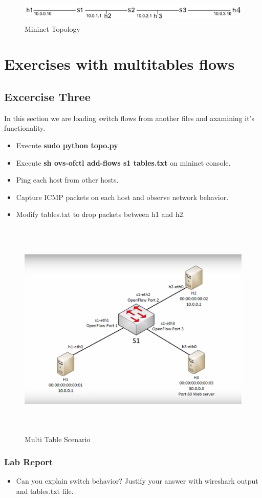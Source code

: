 \documentclass{../UTNetLab}
\begin{document}
    \begin{figure}[H]
    	\centering
    	\includegraphics[height=30pt]{img/fig1.png}
    	\caption{Mininet Topology}
    	\label{fig:linearRouters}
    \end{figure}


\section{Exercises with multitables flows}
    \subsection*{Excercise Three}
    In this section we are loading switch flows from another files and axamining it's functionality.

    \begin{itemize}
    	\setlength{\itemindent}{10pt}
    	\item Execute \textbf{sudo python topo.py} 
    	\item Execute \textbf{sh ovs-ofctl add-flows s1 tables.txt} on mininet console.
    	\item Ping each host from other hosts.
    	\item Capture ICMP packets on each host and observe network behavior.
    	\item Modify tables.txt to drop packets between h1 and h2.
    \end{itemize}

    \begin{figure}[H]
    	\centering
    	\includegraphics[height=300pt]{img/fig2.png}
    	\caption{Multi Table Scenario}
    	\label{fig:MultiTableScenario}
    \end{figure}


    \subsubsection*{Lab Report}
    \begin{itemize}
    	\setlength{\itemindent}{0pt}
    	\item Can you explain switch behavior? Justify your answer with wireshark output and tables.txt file.
    \end{itemize}
\end{document}
